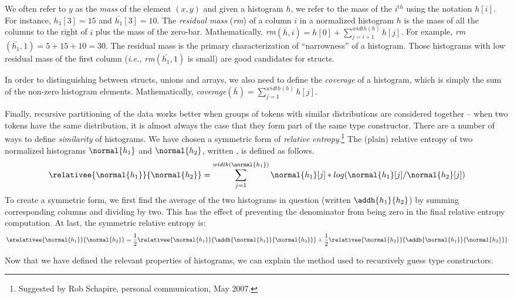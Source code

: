 We often refer to $y$ as the {\em mass} of the element $(x,y)$
and given a histogram $h$, we refer to the mass of the $i^{\mathrm th}$
using the notation $h[i]$.  For instance, $h_1[3] = 15$ and 
$\bar{h_1}[3] = 10$.  The {\em residual mass} ({\em rm}) of a column $i$ in 
a normalized histogram $h$ is the mass of all the columns to the right of 
$i$ plus the mass of the zero-bar.  Mathematically, 
{\em rm}$(\bar{h},i) = h[0] + \sum_{j=i+1}^{\mathit{width}(h)} h[j]$.
For example, {\em rm}$(\bar{h_1},1) = 5 + 15 + 10 = 30$.
The residual mass is the primary characterization of ``narrowness''
of a histogram.  Those histograms with low residual mass of the first
column ({\em i.e.,} {\em rm}$(\bar{h_1},1)$ is small) 
are good candidates for structs.

In order to distinguishing between
structs, unions and arrays,
we also need to define the {\em coverage} of a histogram, which
is simply the sum of the non-zero histogram elements.  Mathematically,
{\em coverage}$(\bar{h}) = \sum_{j=1}^{\mathit{width}(h)} h[j]$.

Finally, recursive partitioning of the data works better when
groups of tokens with similar distributions are considered together
-- when two tokens have the same distribution, it is almost always the 
case that they form part of the same type constructor.  There are a 
number of ways to define {\em similarity} of histograms.  We have
chosen a symmetric form of {\em relative entropy}.\footnote{Suggested
by Rob Schapire, personal communication, May 2007.}  
The (plain) relative entropy
of two normalized histograms $\normal{h_1}$ and $\normal{h_2}$, 
written , is
defined as follows.
\[
 \relativee{\normal{h_1}}{\normal{h_2}} 
   = \sum_{j=1}^{\mathit{width}(\normal{h_1})} \normal{h_1}[j]*log(\normal{h_1}[j]/\normal{h_2}[j])
\]
To create a symmetric form, we first find the average of the two
histograms in question (written $\addh{h_1}{h_2}$)
by summing corresponding columns and dividing by two.  This
has the effect of preventing the denominator from being zero in the 
final relative entropy computation.  At last, the symmetric
relative entropy is:
\[
 \srelativee{\normal{h_1}}{\normal{h_2}} 
   = \frac{1}{2}  \relativee{\normal{h_1}}{\addh{\normal{h_1}}{\normal{h_2}}}
   +  \frac{1}{2}  \relativee{\normal{h_2}}{\addh{\normal{h_1}}{\normal{h_2}}}
\]

Now that we have defined the relevant properties of histograms,
we can explain the method used to recursively guess type constructors.

